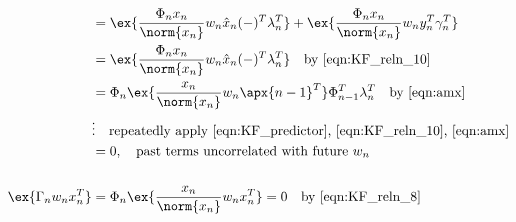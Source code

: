 \begin{align}
&=\ex{\frac{\Phi_{n}x_{n}}{\norm{x_{n}}} w_n  \hat{x}_n(-)^T \lambda_n^T} +  \ex{\frac{\Phi_{n}x_{n}}{\norm{x_{n}}} w_n  y_n^T \gamma_n^T} \\
&=\ex{\frac{\Phi_{n}x_{n}}{\norm{x_{n}}} w_n  \hat{x}_n(-)^T \lambda_n^T} \quad \text{by \ref{eqn:KF_reln_10}} \\
&=\Phi_{n}\ex{\frac{x_{n}}{\norm{x_{n}}} w_n \apx{n-1}^T} \Phi_{n-1}^T \lambda_n^T \quad \text{by \ref{eqn:amx}} \\
&\vdots \quad \text{repeatedly apply \ref{eqn:KF_predictor}, \ref{eqn:KF_reln_10}, \ref{eqn:amx}} \\
&=0, \quad \text{past terms uncorrelated with future $w_n$} \\
\nonumber \\ 
\ex{\Gamma_n w_n x_n^T} &= \Phi_{n}\ex{\frac{x_{n}}{\norm{x_{n}}} w_n x_n^T} =0 \quad \text{by \ref{eqn:KF_reln_8} } 
\end{align}








\iffalse %
\begin{align}
\sigma_k, R_k &\equiv \iota_0 10^{\iota_1} \\
\iota_0 & \sim \mathcal{U}[0, 1]\\
\iota_1 & \sim \mathcal{U}[\{ -\iota_{max}, -\iota_{max} + 1,  \hdots,  \iota_{min}\}]
\end{align}
Scale magnitudes are set by $\iota_1$, a random integer chosen with uniform probability over $\{ -\iota_{max}, \hdots, \iota_{min} \}$ where we set $\iota_{min} = 3, \iota_{max} = 8$  such that $10^{-\iota_{max}}$ is sufficiently high to avoid machine floating point errors from recursive calculations over $> 10^3$ measurements. Uniformly distributed floating points for $\sigma_k, R_k $ in each order of magnitude is set by $\iota_0$. 
\fi